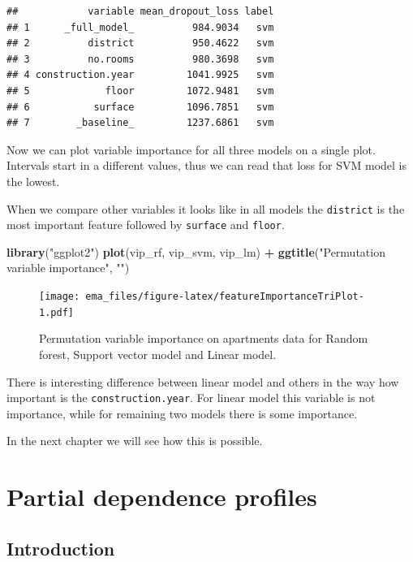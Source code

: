 \documentclass[]{krantz}
\newenvironment{Shaded}{\begin{snugshade}}{\end{snugshade}}
\newcommand{\KeywordTok}[1]{\textcolor[rgb]{0.13,0.29,0.53}{\textbf{#1}}}
\newcommand{\NormalTok}[1]{#1}
\newcommand{\OperatorTok}[1]{\textcolor[rgb]{0.81,0.36,0.00}{\textbf{#1}}}
\newcommand{\StringTok}[1]{\textcolor[rgb]{0.31,0.60,0.02}{#1}}
\begin{document}
\begin{verbatim}
##            variable mean_dropout_loss label
## 1      _full_model_          984.9034   svm
## 2          district          950.4622   svm
## 3          no.rooms          980.3698   svm
## 4 construction.year         1041.9925   svm
## 5             floor         1072.9481   svm
## 6           surface         1096.7851   svm
## 7        _baseline_         1237.6861   svm
\end{verbatim}

Now we can plot variable importance for all three models on a single plot.
Intervals start in a different values, thus we can read that loss for SVM model is the lowest.

When we compare other variables it looks like in all models the \texttt{district} is the most important feature followed by \texttt{surface} and \texttt{floor}.

\begin{Shaded}
\begin{Highlighting}[]
\KeywordTok{library}\NormalTok{(}\StringTok{"ggplot2"}\NormalTok{)}
\KeywordTok{plot}\NormalTok{(vip_rf, vip_svm, vip_lm) }\OperatorTok{+}
\StringTok{  }\KeywordTok{ggtitle}\NormalTok{(}\StringTok{"Permutation variable importance"}\NormalTok{, }\StringTok{""}\NormalTok{)}
\end{Highlighting}
\end{Shaded}

\begin{figure}
\centering
\texttt{[image: ema\_files/figure-latex/featureImportanceTriPlot-1.pdf]}
\caption{\label{fig:featureImportanceTriPlot}Permutation variable importance on apartments data for Random forest, Support vector model and Linear model.}
\end{figure}

There is interesting difference between linear model and others in the way how important is the \texttt{construction.year}. For linear model this variable is not importance, while for remaining two models there is some importance.

In the next chapter we will see how this is possible.

\hypertarget{partialDependenceProfiles}{%
\chapter{Partial dependence profiles}\label{partialDependenceProfiles}}

\hypertarget{PDPIntro}{%
\section{Introduction}\label{PDPIntro}}
\end{document}
